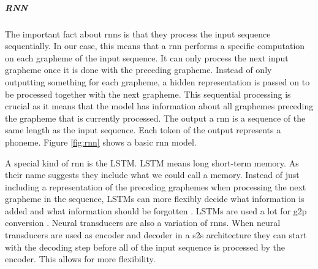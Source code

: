 
\subparagraph{RNN}
The important fact about \acp{rnn} is that they process the input sequence sequentially. In our case, this means that a \ac{rnn} performs a specific computation on each grapheme of the input sequence. It can only process the next input grapheme once it is done with the preceding grapheme. Instead of only outputting something for each grapheme, a hidden representation is passed on to be processed together with the next grapheme. This sequential processing is crucial as it means that the model has information about all graphemes preceding the grapheme that is currently processed. The output a \ac{rnn} is a sequence of the same length as the input sequence. Each token of the output represents a phoneme. Figure \ref{fig:rnn} shows a basic \ac{rnn} model. 

A special kind of \ac{rnn} is the LSTM. LSTM means long short-term memory. As their name suggests they include what we could call a memory. Instead of just including a representation of the preceding graphemes when processing the next grapheme in the sequence, LSTMs can more flexibly decide what information is added and what information should be forgotten \citep{Olah.29.01.2022, Kostadinov.2017}. LSTMs are used a lot for \ac{g2p} conversion \citep{Lee&Ashby.2020, hammond-2021-data, gautam.2021, Rao2015GraphemetophonemeCU}.
Neural transducers are also a variation of \acp{rnn}. When neural transducers are used as encoder and decoder in a \ac{s2s} architecture they can start with the decoding step before all of the input sequence is processed by the encoder. This allows for more flexibility.


